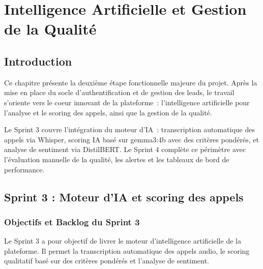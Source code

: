\chapter[IA et Gestion de la Qualité]{Intelligence Artificielle et Gestion de la Qualité}
\label{chap:ia_quality}

\section*{Introduction}
\label{sec:chap5_introduction}

Ce chapitre présente la deuxième étape fonctionnelle majeure du projet. Après la mise en place
du socle d'authentification et de gestion des leads, le travail s'oriente vers le coeur
innovant de la plateforme~: l'intelligence artificielle pour l'analyse et le scoring des
appels, ainsi que la gestion de la qualité.

Le Sprint 3 couvre l'intégration du moteur d'IA~: transcription automatique des appels via
Whisper, scoring IA basé sur gemma3:4b avec des critères pondérés, et analyse de sentiment
via DistilBERT. Le Sprint 4 complète ce périmètre avec l'évaluation manuelle de la qualité,
les alertes et les tableaux de bord de performance.

\section[Sprint 3 : Moteur d'IA]{Sprint 3 : Moteur d'IA et scoring des appels}
\label{sec:sprint3}

\subsection{Objectifs et Backlog du Sprint 3}
\label{subsec:sprint3_backlog}

Le Sprint 3 a pour objectif de livrer le moteur d'intelligence artificielle de la plateforme.
Il permet la transcription automatique des appels audio, le scoring qualitatif basé sur des
critères pondérés et l'analyse de sentiment.

